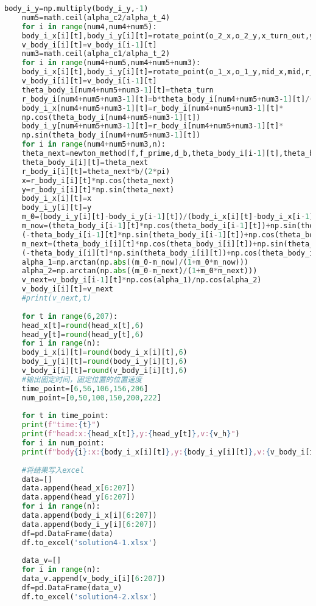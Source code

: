 \documentclass[withoutpreface,bwprint]{cumcmthesis} %
\begin{document}
\begin{lstlisting}[language=Python]
	body_i_y=np.multiply(body_i_y,-1)
	num5=math.ceil(alpha_c2/alpha_t_4)
	for i in range(num4,num4+num5):
	body_i_x[i][t],body_i_y[i][t]=rotate_point(o_2_x,o_2_y,x_turn_out,y_turn_out,r_2,alpha_t_4)
	v_body_i[i][t]=v_body_i[i-1][t]
	num3=math.ceil(alpha_c1/alpha_t_2)
	for i in range(num4+num5,num4+num5+num3):
	body_i_x[i][t],body_i_y[i][t]=rotate_point(o_1_x,o_1_y,mid_x,mid,r_1,alpha_t_2)
	v_body_i[i][t]=v_body_i[i-1][t]
	theta_body_i[num4+num5+num3-1][t]=theta_turn
	r_body_i[num4+num5+num3-1][t]=b*theta_body_i[num4+num5+num3-1][t]/(2*pi)
	body_i_x[num4+num5+num3-1][t]=r_body_i[num4+num5+num3-1][t]*
	np.cos(theta_body_i[num4+num5+num3-1][t])
	body_i_y[num4+num5+num3-1][t]=r_body_i[num4+num5+num3-1][t]*
	np.sin(theta_body_i[num4+num5+num3-1][t])
	for i in range(num4+num5+num3,n):
	theta_next=newton_method(f,f_prime,d_b,theta_body_i[i-1][t],theta_body_i[i-1][t]+pi/2)
	theta_body_i[i][t]=theta_next
	r_body_i[i][t]=theta_next*b/(2*pi)
	x=r_body_i[i][t]*np.cos(theta_next)
	y=r_body_i[i][t]*np.sin(theta_next)
	body_i_x[i][t]=x
	body_i_y[i][t]=y
	m_0=(body_i_y[i][t]-body_i_y[i-1][t])/(body_i_x[i][t]-body_i_x[i-1][t])
	m_now=(theta_body_i[i-1][t]*np.cos(theta_body_i[i-1][t])+np.sin(theta_body_i[i-1][t]))/
	(-theta_body_i[i-1][t]*np.sin(theta_body_i[i-1][t])+np.cos(theta_body_i[i-1][t]))
	m_next=(theta_body_i[i][t]*np.cos(theta_body_i[i][t])+np.sin(theta_body_i[i][t]))/
	(-theta_body_i[i][t]*np.sin(theta_body_i[i][t])+np.cos(theta_body_i[i][t]))
	alpha_1=np.arctan(np.abs((m_0-m_now)/(1+m_0*m_now)))
	alpha_2=np.arctan(np.abs((m_0-m_next)/(1+m_0*m_next)))
	v_next=v_body_i[i-1][t]*np.cos(alpha_1)/np.cos(alpha_2)
	v_body_i[i][t]=v_next
	#print(v_next,t)
	
	for t in range(6,207):
	head_x[t]=round(head_x[t],6)
	head_y[t]=round(head_y[t],6)
	for i in range(n):
	body_i_x[i][t]=round(body_i_x[i][t],6)
	body_i_y[i][t]=round(body_i_y[i][t],6)
	v_body_i[i][t]=round(v_body_i[i][t],6)
	#输出固定时间，固定位置的位置速度
	time_point=[6,56,106,156,206]
	num_point=[0,50,100,150,200,222]
	
	for t in time_point:
	print(f"time:{t}")
	print(f"head:x:{head_x[t]},y:{head_y[t]},v:{v_h}")
	for i in num_point:
	print(f"body{i}:x:{body_i_x[i][t]},y:{body_i_y[i][t]},v:{v_body_i[i][t]}")
	
	#将结果写入excel
	data=[]
	data.append(head_x[6:207])
	data.append(head_y[6:207])
	for i in range(n):
	data.append(body_i_x[i][6:207])
	data.append(body_i_y[i][6:207])
	df=pd.DataFrame(data)
	df.to_excel('solution4-1.xlsx')
	
	data_v=[]
	for i in range(n):
	data_v.append(v_body_i[i][6:207])
	df=pd.DataFrame(data_v)
	df.to_excel('solution4-2.xlsx')
	\end{lstlisting}
\end{document}
